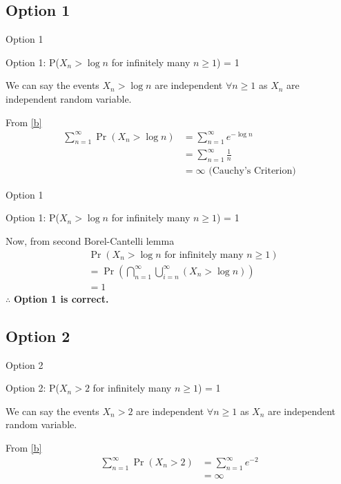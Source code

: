 \documentclass{beamer}
\providecommand{\pr}[1]{\ensuremath{\Pr\left(#1\right)}}
\providecommand{\pr}[1]{\ensuremath{\Pr\left(#1\right)}}
\providecommand{\brak}[1]{\ensuremath{\left(#1\right)}}
\theoremstyle{remark}
\numberwithin{equation}{subsection}
\begin{document}
\subsection{Option 1}
\begin{frame}{Option 1}
\begin{block}{Option 1: P($X_n > \log n$ for infinitely many $n \geq 1$) = 1}

We can say the events $X_n>\log n$ are independent $\forall n\geq 1$ as $X_n$ are independent random variable.
    
    From \eqref{b}
    \begin{align}
        \sum_{n=1}^{\infty}\pr{X_n > \log n} &=\sum_{n=1}^{\infty}e^{-\log n}\nonumber\\ &=\sum_{n=1}^{\infty}\frac{1}{n}\nonumber\\
                                            &= \infty \text{ (Cauchy's Criterion)}\nonumber
    \end{align}
   
\end{block}
\end{frame}

\begin{frame}{Option 1}
\begin{block}{Option 1: P($X_n > \log n$ for infinitely many $n \geq 1$) = 1}

    Now, from second Borel-Cantelli lemma
    \begin{align}
        &\pr{X_n>\log n \text{ for infinitely many }n\geq1}\nonumber\\
        &=\pr{\bigcap_{n=1}^{\infty}\bigcup_{i=n}^{\infty}\brak{X_n>\log n}}\nonumber\\
        &=1\nonumber
    \end{align}
    $\therefore$ \textbf{Option 1 is correct. }

\end{block}
\end{frame}



\subsection{Option 2}
\begin{frame}{Option 2}
\begin{block}{Option 2: P($X_n > 2$ for infinitely many $n \geq 1$) = 1}

 We can say the events $X_n>2$ are independent $\forall n\geq 1$ as $X_n$ are independent random variable.
    
    From \eqref{b}
    \begin{align}
        \sum_{n=1}^{\infty}\pr{X_n > 2} &= \sum_{n=1}^{\infty}e^{-2}\nonumber\\
                                            &= \infty\nonumber
    \end{align}
   
\end{block}
\end{frame}
\end{document}

